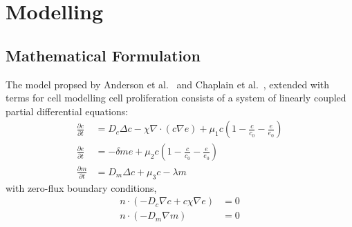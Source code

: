 \section{Modelling}

\subsection{Mathematical Formulation}

The model propsed by Anderson et al.~\cite{anderson_continuous_1998,anderson_mathematical_2000} and Chaplain et al.~\cite{anderson_continuous_1998,chaplain_mathematical_2006-1,franssen_mathematical_2019}, extended with terms for cell modelling cell proliferation consists of a system of linearly coupled partial differential equations: 
\begin{align}
	\frac{\partial c}{\partial t} &= D_c \Delta c - \chi \nabla \cdot (c\nabla e)  + \mu_1 c\left(1-\frac{c}{c_0}-\frac{e}{e_0}\right)\label{eq1}\\
	\frac{\partial e}{\partial t} &= -\delta m e  + \mu_2 c\left(1-\frac{c}{c_0}-\frac{e}{e_0}\right)\label{eq2}\\
	\frac{\partial m}{\partial t} &= D_m \Delta c + \mu_3 c - \lambda m\label{eq3}
\end{align}
with zero-flux boundary conditions, 
\begin{align}
	n\cdot (-D_c \nabla c + c \chi\nabla e) &= 0 \label{eq4}\\
	n \cdot (-D_m\nabla m ) &= 0\label{eq5}
\end{align}

